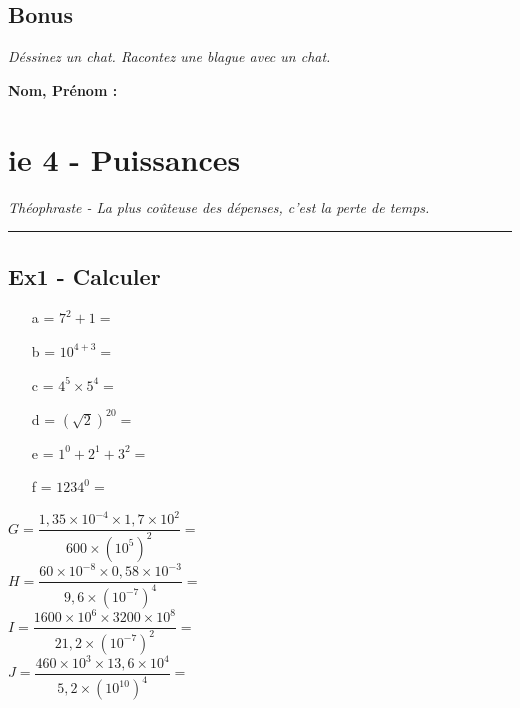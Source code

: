 \documentclass[12pt]{article}
\newcommand{\horrule}[1]{\rule{\linewidth}{#1}} %
\newcommand{\Pointilles}[1]{%
  \par\nobreak
  \noindent\rule{0pt}{1.5\baselineskip}%
  \multido{}{#1}{\noindent\makebox[\linewidth]{\dotfill}\endgraf}%
  \bigskip%
}
\begin{document}
\Pointilles{20}

\subsection*{Bonus}

\textit{Déssinez un chat. Racontez une blague avec un chat.}


%
%

\newpage

%
%
\textbf{Nom, Prénom : }

\section*{ie 4 - Puissances}
\begin{center}
  \textit{Théophraste - La plus coûteuse des dépenses, c’est la perte de temps.}
\end{center}
\horrule{2px}

\subsection*{Ex1 - Calculer}

\begin{multicols}{3}
  \begin{itemize}
  \item[a =] $7^2 + 1 = $ \dotfill
  \item[b =] $10^{4+3} = $ \dotfill
  \item[c =] $4^5 \times 5^4 = $ \dotfill
  \item[d =] $(\sqrt{2})^20 = $ \dotfill
  \item[e =] $1^0 + 2^1 + 3^2 = $ \dotfill
  \item[f =] $1234^0 = $ \dotfill
  \end{itemize}

\end{multicols}

\begin{multicols}{2}

  $G = \dfrac{1,35 \times 10^{-4} \times 1,7 \times 10^{2}}{600 \times (10^5)^2} = $ \dotfill\\
  $H = \dfrac{60 \times 10^{-8} \times 0,58 \times 10^{-3}}{9,6 \times (10^{-7})^4} = $ \dotfill \\
  $I = \dfrac{1600 \times 10^{6} \times 3200 \times 10^{8}}{21,2 \times (10^{-7})^2} = $ \dotfill\\
  $J = \dfrac{460 \times 10^{3} \times 13,6 \times 10^{4}}{5,2 \times (10^{10})^4} = $ \dotfill 

\end{multicols}
\end{document}
